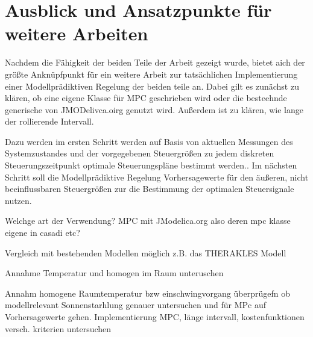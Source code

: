 \section{Ausblick und Ansatzpunkte für weitere Arbeiten}
\label{sec:ausblick}

Nachdem die Fähigkeit der beiden Teile der Arbeit gezeigt wurde, bietet aich der größte Anknüpfpunkt für ein weitere Arbeit zur tatsächlichen Implementierung einer Modellprädiktiven Regelung der beiden teile an. Dabei gilt es zunächst zu klären, ob eine eigene Klasse für MPC geschrieben wird oder die besteehnde generische von JMODelivca.oirg genutzt wird. Außerdem ist zu klären, wie lange der rollierende Intervall.

Dazu werden im ersten Schritt werden auf Basis von aktuellen Messungen des Systemzustandes und der vorgegebenen Steuergrößen zu jedem diskreten Steuerungszeitpunkt optimale Steuerungspläne bestimmt werden..
Im nächsten Schritt soll die Modellprädiktive Regelung Vorhersagewerte für den äußeren, nicht beeinflussbaren Steuergrößen zur die Bestimmung der optimalen Steuersignale nutzen.

Welchge art der Verwendung?
MPC mit JModelica.org also deren mpc klasse
eigene in casadi
etc?

Vergleich mit bestehenden Modellen möglich z.B. das THERAKLES Modell

Annahme Temperatur und homogen im Raum unteruschen

Annahm homogene Raumtemperatur bzw einschwingvorgang überprügefn ob modellrelevant
Sonnenstarhlung genauer untersuchen und für MPc auf Vorhersagewerte gehen.
Implementierung MPC, länge intervall, kostenfunktionen versch. kriterien untersuchen